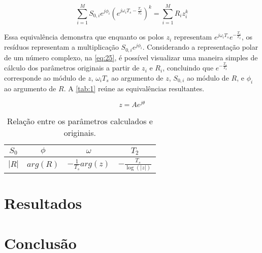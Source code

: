\documentclass[12pt]{article}
\begin{document}
\begin{equation} \label{eq:24}
    \sum_{i=1}^{M} S_{0, i} e^{j \phi_i}  (e^{j\omega_i T_s -\frac{T_s}{T_2}})^k  = \sum_{i = 1}^{M} R_i z_i^{k}
\end{equation}

Essa equivalência demonstra que enquanto os polos $z_i$ representam $e^{j\omega_i T_s} e^{-\frac{T_s}{T_2}}$, os resíduos representam a multiplicação 
$S_{0, i} e^{j \phi_i}$. Considerando a representação polar de um número complexo, na \autoref{eq:25}, é possível visualizar uma maneira simples de 
cálculo dos parâmetros originais a partir de $z_i$ e $R_i$, concluindo que $e^{-\frac{T_s}{T_2}}$ corresponde ao módulo de $z$, $\omega_i T_s$ ao argumento de $z$,
$S_{0, i}$ ao módulo de $R$, e $\phi_i$ ao argumento de $R$. A \autoref{tab:1} reúne as equivalências resultantes.

\begin{equation} \label{eq:25}
    z = A e^{j \theta}    
\end{equation}

\begin{table}[H]
    \centering
    \begin{tabular}{|c|c|c|c|}
        \hline
        $S_0$ & $\phi$ & $\omega$ & $T_2$ \\ 
        \hline
        $|R|$ & $arg(R)$ & $-\frac{1}{T_s} arg(z)$ & $-\frac{T_s}{\log(|z|)}$ \\
        \hline
    \end{tabular}
    \caption{Relação entre os parâmetros calculados e originais.}
    \label{tab:1}
\end{table}




\section{Resultados}

\section{Conclusão}






\end{document}
